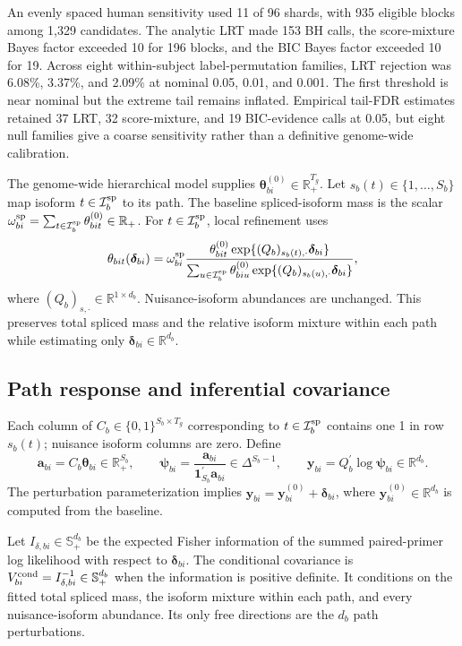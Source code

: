\documentclass[11pt]{article}
\begin{document}
An evenly spaced human sensitivity used 11 of 96 shards, with 935 eligible blocks among 1,329 candidates. The analytic LRT made 153 BH calls, the score-mixture Bayes factor exceeded 10 for 196 blocks, and the BIC Bayes factor exceeded 10 for 19. Across eight within-subject label-permutation families, LRT rejection was 6.08\%, 3.37\%, and 2.09\% at nominal 0.05, 0.01, and 0.001. The first threshold is near nominal but the extreme tail remains inflated. Empirical tail-FDR estimates retained 37 LRT, 32 score-mixture, and 19 BIC-evidence calls at 0.05, but eight null families give a coarse sensitivity rather than a definitive genome-wide calibration.

The genome-wide hierarchical model supplies \(\bm\theta_{bi}^{(0)}\in\mathbb R_+^{T_g}\). Let \(s_b(t)\in\{1,\ldots,S_b\}\) map isoform \(t\in\mathcal I_b^{\rm sp}\) to its path. The baseline spliced-isoform mass is the scalar \(\omega_{bi}^{\rm sp}=\sum_{t\in\mathcal I_b^{\rm sp}} \theta_{bit}^{(0)}\in\mathbb R_+\). For \(t\in\mathcal I_b^{\rm sp}\), local refinement uses \[
 \theta_{bit}(\bm\delta_{bi})
 =\omega_{bi}^{\rm sp}\frac{\theta_{bit}^{(0)}
 \exp\{(Q_b)_{s_b(t),\cdot}\bm\delta_{bi}\}}
 {\sum_{u\in\mathcal I_b^{\rm sp}}\theta_{biu}^{(0)}
 \exp\{(Q_b)_{s_b(u),\cdot}\bm\delta_{bi}\}},
\]
where \((Q_b)_{s,\cdot}\in\mathbb R^{1\times d_b}\). Nuisance-isoform abundances are unchanged. This preserves total spliced mass and the relative isoform mixture within each path while estimating only \(\bm\delta_{bi}\in\mathbb R^{d_b}\).

\subsection*{Path response and inferential covariance}

Each column of \(C_b\in\{0,1\}^{S_b\times T_g}\) corresponding to \(t\in\mathcal I_b^{\rm sp}\) contains one 1 in row \(s_b(t)\); nuisance isoform columns are zero. Define \[
 \bm a_{bi}=C_b\bm\theta_{bi}\in\mathbb R_+^{S_b},\qquad
 \bm\psi_{bi}=\frac{\bm a_{bi}}
 {\bm1_{S_b}^\prime\bm a_{bi}}\in\Delta^{S_b-1},\qquad
 \bm y_{bi}=Q_b^\prime\log\bm\psi_{bi}\in\mathbb R^{d_b}.
\]
The perturbation parameterization implies \(\bm y_{bi}=\bm y_{bi}^{(0)}+\bm\delta_{bi}\), where \(\bm y_{bi}^{(0)}\in\mathbb R^{d_b}\) is computed from the baseline.

Let \(I_{\delta,bi}\in\mathbb S_+^{d_b}\) be the expected Fisher information of the summed paired-primer log likelihood with respect to \(\bm\delta_{bi}\). The conditional covariance is \(V_{bi}^{\rm cond}=I_{\delta,bi}^{-1}\in\mathbb S_+^{d_b}\) when the information is positive definite. It conditions on the fitted total spliced mass, the isoform mixture within each path, and every nuisance-isoform abundance. Its only free directions are the \(d_b\) path perturbations.
\end{document}
